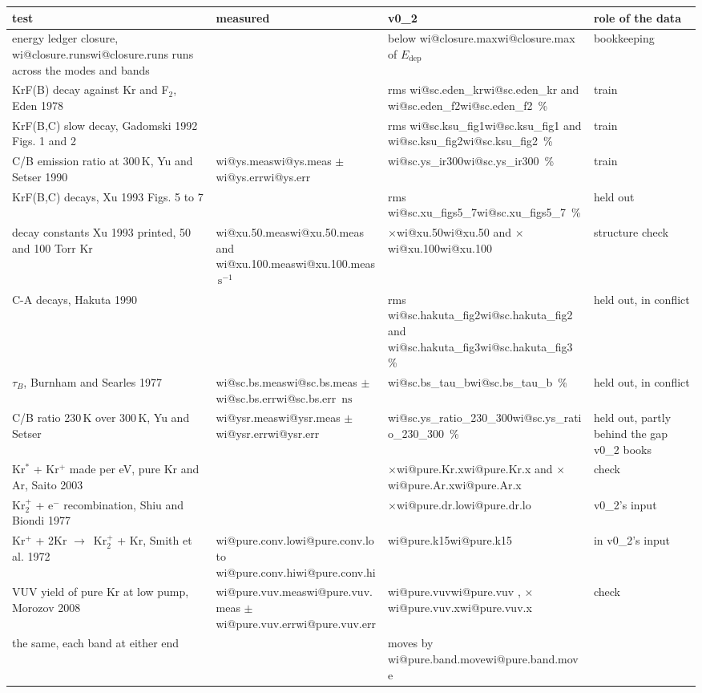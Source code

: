 \documentclass[11pt]{article}
\makeatletter
\newcommand\wi[1]{\ifcsname wi@#1\endcsname\csname wi@#1\endcsname
  \else\errmessage{no overview number '#1'. Rerun make_overview_v0_2.py}\fi}
\newcommand{\unit}[1]{\ensuremath{\,\mathrm{#1}}}
\newcommand{\el}{\ensuremath{\mathrm{e}^-}}
\newcommand{\Krs}{Kr\ensuremath{^*}}
\newcommand{\Krp}{Kr\ensuremath{^+}}
\newcommand{\Krtp}{Kr\ensuremath{_2^+}}
\newcommand{\ra}{\ensuremath{\to}\ }
\newcommand{\Edep}{\ensuremath{E_\mathrm{dep}}}
\newcommand{\x}[1]{\ensuremath{\times}#1}
\makeatother
\begin{document}
\begin{table}[h]
\centering\footnotesize
\renewcommand{\arraystretch}{1.12}
\begin{tabularx}{\linewidth}{@{}>{\raggedright\arraybackslash}X
  >{\raggedright\arraybackslash}p{2.6cm}>{\raggedright\arraybackslash}p{2.5cm}
  >{\raggedright\arraybackslash}p{2.5cm}@{}}
\toprule
test & measured & v0\_2 & role of the data\\
\midrule
energy ledger closure, \wi{closure.runs} runs across the modes and bands &
  & below \wi{closure.max} of \Edep & bookkeeping\\
KrF(B) decay against Kr and F$_2$, Eden 1978 & & rms \wi{sc.eden_kr} and
  \wi{sc.eden_f2}\,\% & train\\
KrF(B,C) slow decay, Gadomski 1992 Figs. 1 and 2 & & rms \wi{sc.ksu_fig1}
  and \wi{sc.ksu_fig2}\,\% & train\\
C/B emission ratio at 300\unit{K}, Yu and Setser 1990 & \wi{ys.meas}
  $\pm$ \wi{ys.err} & \wi{sc.ys_ir300}\,\% & train\\
KrF(B,C) decays, Xu 1993 Figs. 5 to 7 & & rms \wi{sc.xu_figs5_7}\,\% &
  held out\\
decay constants Xu 1993 printed, 50 and 100 Torr Kr & \wi{xu.50.meas}
  and \wi{xu.100.meas}\unit{s^{-1}} & \x{\wi{xu.50}} and \x{\wi{xu.100}} &
  structure check\\
C-A decays, Hakuta 1990 & & rms \wi{sc.hakuta_fig2} and
  \wi{sc.hakuta_fig3}\,\% & held out, in conflict\\
$\tau_B$, Burnham and Searles 1977 & \wi{sc.bs.meas} $\pm$
  \wi{sc.bs.err}\unit{ns} & \wi{sc.bs_tau_b}\,\% & held out, in conflict\\
C/B ratio 230\unit{K} over 300\unit{K}, Yu and Setser & \wi{ysr.meas}
  $\pm$ \wi{ysr.err} & \wi{sc.ys_ratio_230_300}\,\% & held out, partly
  behind the gap v0\_2 books\\
\midrule
\Krs{} + \Krp{} made per eV, pure Kr and Ar, Saito 2003 & & \x{\wi{pure.Kr.x}}
  and \x{\wi{pure.Ar.x}} & check\\
\Krtp{} + \el{} recombination, Shiu and Biondi 1977 & & \x{\wi{pure.dr.lo}}
  & v0\_2's input\\
\Krp{} + 2Kr \ra \Krtp{} + Kr, Smith et al. 1972 & \wi{pure.conv.lo} to
  \wi{pure.conv.hi} & \wi{pure.k15} & in v0\_2's input\\
VUV yield of pure Kr at low pump, Morozov 2008 & \wi{pure.vuv.meas}
  $\pm$ \wi{pure.vuv.err} & \wi{pure.vuv}, \x{\wi{pure.vuv.x}} & check\\
\quad the same, each band at either end & & moves by \wi{pure.band.move}

\end{tabularx}
\end{table}
\end{document}
